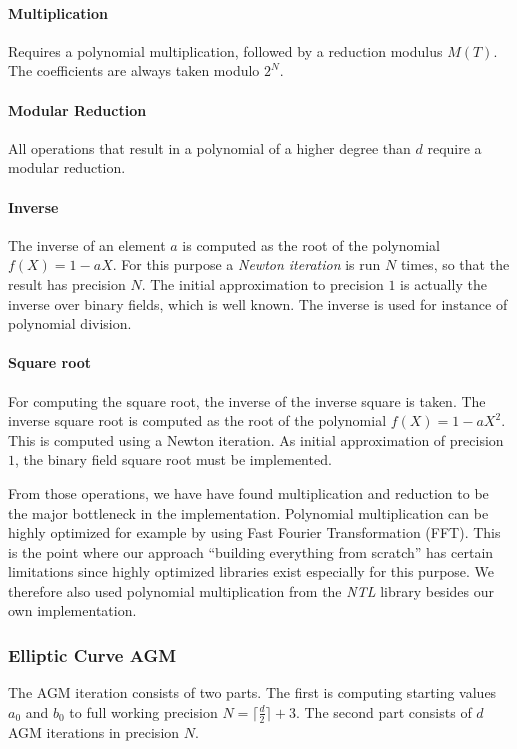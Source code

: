 \documentclass[11pt,english]{article}
\begin{document}
\paragraph{Multiplication}
Requires a polynomial multiplication, followed by a reduction modulus $M(T)$. The coefficients are always taken modulo $2^N$.
\paragraph{Modular Reduction}
All operations that result in a polynomial of a higher degree than $d$ require a modular reduction.
\paragraph{Inverse}
The inverse of an element $a$ is computed as the root of the polynomial $f(X)=1-aX$. For this purpose a \emph{Newton iteration} is run $N$ times, so that the result has precision $N$. The initial approximation to precision $1$ is actually the inverse over binary fields, which is well known. The inverse is used for instance of polynomial division.
\paragraph{Square root}
For computing the square root, the inverse of the inverse square is taken. The inverse square root is computed as the root of the polynomial $f(X)=1-aX^2$. This is computed using a Newton iteration. As initial approximation of precision $1$, the  binary field square root must be implemented.

From those operations, we have have found multiplication and reduction to be the major bottleneck in the implementation. Polynomial multiplication can be highly optimized for example by using Fast Fourier Transformation (FFT). This is the point where our approach ``building everything from scratch'' has certain limitations since highly optimized libraries exist especially for this purpose. We therefore also used polynomial multiplication from the \emph{NTL} library besides our own implementation.

\subsubsection{Elliptic Curve AGM}
The AGM iteration consists of two parts. The first is computing starting values $a_0$ and $b_0$ to full working precision $N=\lceil\frac{d}{2}\rceil+3$. The second part consists of $d$ AGM iterations in precision $N$.
\end{document}
